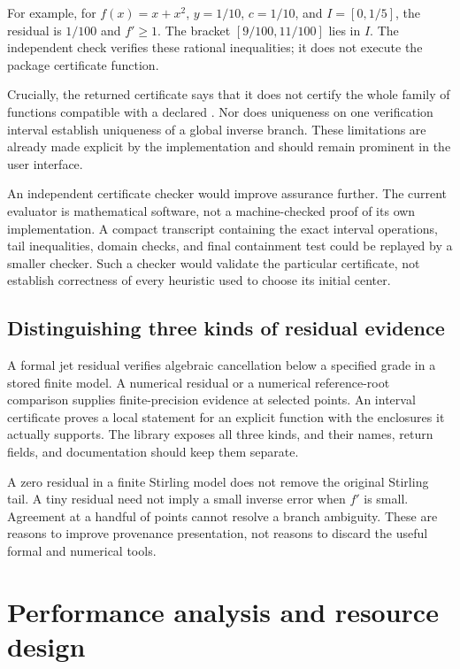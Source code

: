 \documentclass[11pt,a4paper]{article}
\newcommand{\code}[1]{\texttt{\detokenize{#1}}}
\begin{document}
For example, for $f(x)=x+x^2$, $y=1/10$, $c=1/10$, and $I=[0,1/5]$, the
residual is $1/100$ and $f'\geq1$. The bracket $[9/100,11/100]$ lies in $I$.
The independent check verifies these rational inequalities; it does not
execute the package certificate function.

Crucially, the returned certificate says that it does not certify the whole
family of functions compatible with a declared \code{InputRemainder}.
Nor does uniqueness on one verification interval establish uniqueness of a
global inverse branch. These limitations are already made explicit by the
implementation and should remain prominent in the user interface.
\cite{certificates}

An independent certificate checker would improve assurance further. The
current evaluator is mathematical software, not a machine-checked proof of
its own implementation. A compact transcript containing the exact interval
operations, tail inequalities, domain checks, and final containment test
could be replayed by a smaller checker. Such a checker would validate the
particular certificate, not establish correctness of every heuristic used
to choose its initial center.

\subsection{Distinguishing three kinds of residual evidence}
A formal jet residual verifies algebraic cancellation below a specified
grade in a stored finite model. A numerical residual or a numerical
reference-root comparison supplies finite-precision evidence at selected
points. An interval certificate proves a local statement for an explicit
function with the enclosures it actually supports. The library exposes all
three kinds, and their names, return fields, and documentation should keep
them separate.
\cite{core,certificates,special}

A zero residual in a finite Stirling model does not remove the original
Stirling tail. A tiny residual need not imply a small inverse error when
$f'$ is small. Agreement at a handful of points cannot resolve a branch
ambiguity. These are reasons to improve provenance presentation, not reasons
to discard the useful formal and numerical tools.

\section{Performance analysis and resource design}
\label{sec:performance}
\end{document}
